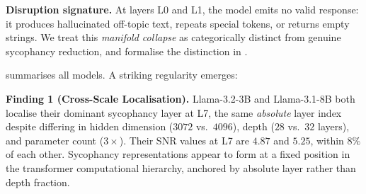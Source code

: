 \documentclass{article}
\begin{document}
\textbf{Disruption signature.}
At layers L0 and L1, the model emits no valid response: it produces
hallucinated off-topic text, repeats special tokens, or returns
empty strings. We treat this \emph{manifold collapse} as
categorically distinct from genuine sycophancy reduction, and
formalise the distinction in .

 summarises all models. A striking regularity emerges:

\begin{findingbox}
\textbf{Finding 1 (Cross-Scale Localisation).}
Llama-3.2-3B and Llama-3.1-8B both localise their dominant sycophancy
layer at L7, the same \emph{absolute} layer index despite differing
in hidden dimension ($3072$ vs.\ $4096$), depth ($28$ vs.\ $32$ layers),
and parameter count ($3\times$). Their SNR values at L7 are $4.87$ and
$5.25$, within $8\%$ of each other. Sycophancy representations appear
to form at a fixed position in the transformer computational hierarchy,
anchored by absolute layer rather than depth fraction.
\end{findingbox}
\end{document}
